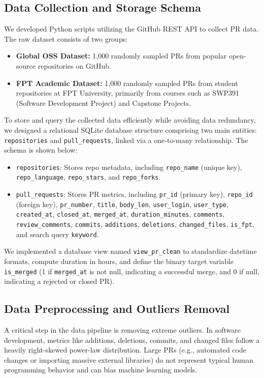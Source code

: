 \documentclass[conference]{IEEEtran}
\begin{document}
\subsection{Data Collection and Storage Schema}
We developed Python scripts utilizing the GitHub REST API to collect PR data. The raw dataset consists of two groups:
\begin{itemize}
  \item \textbf{Global OSS Dataset:} 1,000 randomly sampled PRs from popular open-source repositories on GitHub.
  \item \textbf{FPT Academic Dataset:} 1,000 randomly sampled PRs from student repositories at FPT University, primarily from courses such as SWP391 (Software Development Project) and Capstone Projects.
\end{itemize}

To store and query the collected data efficiently while avoiding data redundancy, we designed a relational SQLite database structure comprising two main entities: \texttt{repositories} and \texttt{pull\_requests}, linked via a one-to-many relationship. The schema is shown below:
\begin{itemize}
  \item \texttt{repositories}: Stores repo metadata, including \texttt{repo\_name} (unique key), \texttt{repo\_language}, \texttt{repo\_stars}, and \texttt{repo\_forks}.
  \item \texttt{pull\_requests}: Stores PR metrics, including \texttt{pr\_id} (primary key), \texttt{repo\_id} (foreign key), \texttt{pr\_number}, \texttt{title}, \texttt{body\_len}, \texttt{user\_login}, \texttt{user\_type}, \texttt{created\_at}, \texttt{closed\_at}, \texttt{merged\_at}, \texttt{duration\_minutes}, \texttt{comments}, \texttt{review\_comments}, \texttt{commits}, \texttt{additions}, \texttt{deletions}, \texttt{changed\_files}, \texttt{is\_fpt}, and search query \texttt{keyword}.
\end{itemize}

We implemented a database view named \texttt{view\_pr\_clean} to standardize datetime formats, compute duration in hours, and define the binary target variable \texttt{is\_merged} (1 if \texttt{merged\_at} is not null, indicating a successful merge, and 0 if null, indicating a rejected or closed PR).

\subsection{Data Preprocessing and Outliers Removal}
A critical step in the data pipeline is removing extreme outliers. In software development, metrics like additions, deletions, commits, and changed files follow a heavily right-skewed power-law distribution. Large PRs (e.g., automated code changes or importing massive external libraries) do not represent typical human programming behavior and can bias machine learning models. 
\end{document}
